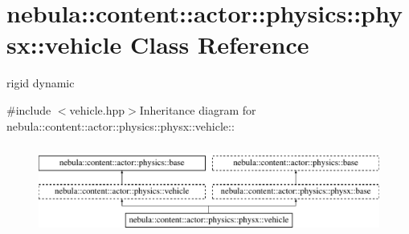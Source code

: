 \hypertarget{classnebula_1_1content_1_1actor_1_1physics_1_1physx_1_1vehicle}{
\section{nebula::content::actor::physics::physx::vehicle Class Reference}
\label{classnebula_1_1content_1_1actor_1_1physics_1_1physx_1_1vehicle}
}


rigid dynamic  


{\ttfamily \#include $<$vehicle.hpp$>$}Inheritance diagram for nebula::content::actor::physics::physx::vehicle::\begin{figure}[H]
\begin{center}
\leavevmode
\includegraphics[height=3cm]{classnebula_1_1content_1_1actor_1_1physics_1_1physx_1_1vehicle}
\end{center}
\end{figure}

